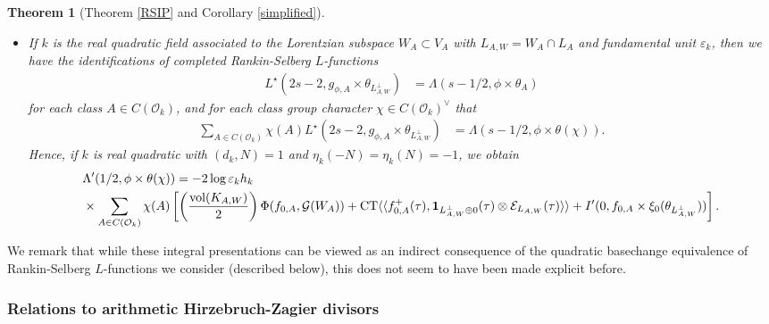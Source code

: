 \documentclass{amsart}
\newtheorem{theorem}{Theorem}[section]
\theoremstyle{definition}
\theoremstyle{definition}
\theoremstyle{definition}
\begin{document}
\begin{theorem}[Theorem \ref{RSIP} and Corollary \ref{simplified}]
\begin{itemize}
\item[(ii)] If $k$ is the real quadratic field associated to the Lorentzian subspace $W_A \subset V_A$ with 
$L_{A,W} = W_A \cap L_A$ and fundamental unit $\varepsilon_k$, then we have the identifications of completed Rankin-Selberg $L$-functions 
\begin{align*} L^{\star}(2s-2, g_{\phi, A} \times \theta_{L_{A, W}^{\perp}}) &= \Lambda(s-1/2, \phi \times \theta_A)\end{align*} 
for each class $A \in C(\mathcal{O}_k)$, and for each class group character $\chi \in C(\mathcal{O}_k)^{\vee}$ that 
\begin{align*} \sum\limits_{A \in C(\mathcal{O}_k)} \chi(A) L^{\star}(2s-2, g_{\phi, A} \times \theta_{L_{A, W}^{\perp}}) 
&= \Lambda(s-1/2, \phi \times \theta(\chi)).\end{align*}
Hence, if $k$ is real quadratic with $(d_k, N)=1$ and $\eta_k(-N) = \eta_k(N) = -1$, we obtain
\begin{align*} &\Lambda'(1/2, \phi \times \theta(\chi)) =-2 \log \varepsilon_k h_k \\ &\times \sum\limits_{A \in C(\mathcal{O}_k)} \chi(A) 
\left[ \left( \frac{\operatorname{vol}( K_{A,W} ) }{ 2} \right) \Phi(f_{0, A}, \mathcal{G}(W_A)) 
+ \operatorname{CT} \langle \langle f_{0, A}^+(\tau), {\bf{1}}_{L_{A, W}^{\perp} \oplus 0}(\tau) \otimes \mathcal{E}_{L_{A, W}}(\tau) \rangle \rangle
+ I'(0, f_{0,A} \times \xi_0(\theta_{L_{A, W}^{\perp}})) \right]. \end{align*}

\end{itemize} \end{theorem}

We remark that while these integral presentations can be viewed as an indirect consequence of the quadratic basechange equivalence 
of Rankin-Selberg $L$-functions we consider (described below), this does not seem to have been made explicit before. 

\subsubsection{Relations to arithmetic Hirzebruch-Zagier divisors}
\end{document}
